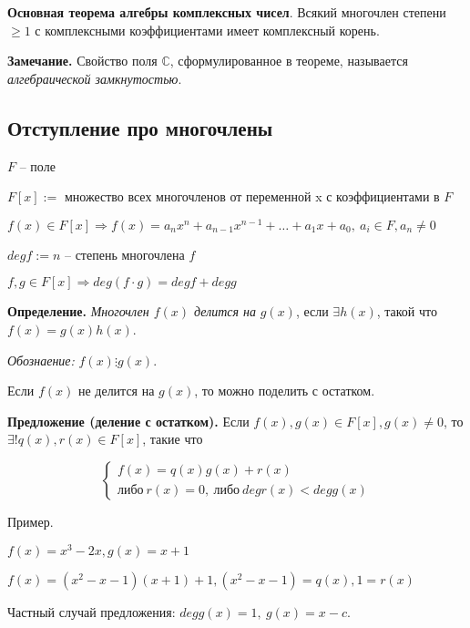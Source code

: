\vspace{\baselineskip}
\textbf{Основная теорема алгебры комплексных чисел}. Всякий многочлен степени $\geq 1$ с комплексными коэффициентами имеет комплексный корень.

\vspace{\baselineskip}
\textbf{Замечание.} Свойство поля $\mathbb{C}$, сформулированное в теореме, называется \textit{алгебраической замкнутостью}.

\subsection{Отступление про многочлены}

$F$ -- поле

$F[x] :=$ множество всех многочленов от переменной x с коэффициентами в $F$

$f(x) \in F[x] \Rightarrow f(x) = a_n x^n + a_{n-1} x^{n-1}+ \dots + a_1 x + a_0, \ a_i \in F, a_n \neq 0$

$deg f := n$ -- степень многочлена $f$

$f, g \in F[x] \Rightarrow deg(f \cdot g) = degf + deg g$

\vspace{\baselineskip}
\textbf{Определение.} \textit{Многочлен $f(x)$ делится на} $g(x)$, если $\exists h(x)$, такой что $f(x) = g(x) h(x)$.

\textit{Обознаение:} $f(x) \vdots g(x)$.

Если $f(x)$ не делится на $g(x)$, то можно поделить с остатком.

\vspace{\baselineskip}
\textbf{Предложение (деление с остатком).} Если $f(x), g(x) \in F[x], g(x) \neq 0$, то $\exists ! q(x), r(x) \in F[x]$, такие что

\begin{equation*}
	\left\{
		\begin{aligned}
			f(x) = q(x) g(x) + r(x)  \\
			либо \ r(x) = 0, \ либо \ degr(x) < degg(x) 
		\end{aligned}
	\right.
\end{equation*}

\vspace{\baselineskip}
Пример.

$f(x) = x^3 - 2x, g(x) = x + 1$

$f(x) = (x^2 - x - 1)(x + 1) + 1, (x^2 - x - 1) = q(x), 1 = r(x)$

\vspace{\baselineskip}
Частный случай предложения: $deg g(x) = 1, \ g(x) = x - c$.

